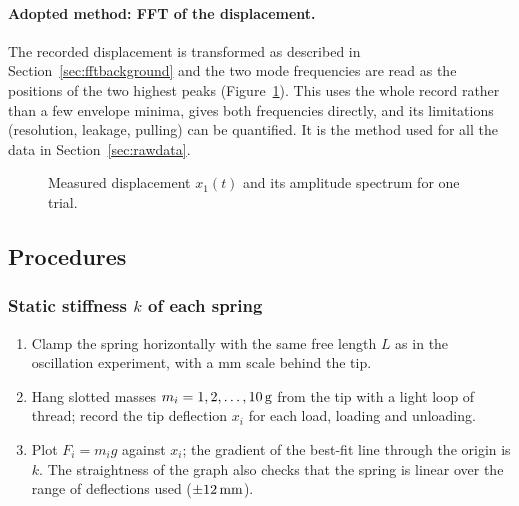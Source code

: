 \paragraph{Adopted method: FFT of the displacement.} The recorded displacement is transformed as described in Section~\ref{sec:fftbackground} and the two mode frequencies are read as the positions of the two highest peaks (Figure~\ref{fig:tracker}). This uses the whole record rather than a few envelope minima, gives both frequencies directly, and its limitations (resolution, leakage, pulling) can be quantified. It is the method used for all the data in Section~\ref{sec:rawdata}.

\begin{figure}[htbp]
\centering
{}
\caption{Measured displacement $x_1(t)$ and its amplitude spectrum for one trial. }
\label{fig:tracker}
\end{figure}

\subsection{Procedures}

\subsubsection{Static stiffness \texorpdfstring{$k$}{k} of each spring}
\begin{enumerate}
\item Clamp the spring horizontally with the same free length $L$ as in the oscillation experiment, with a mm scale behind the tip.
\item Hang slotted masses $m_i=1,2,\ldots,10\,\mathrm{g}$ from the tip with a light loop of thread; record the tip deflection $x_i$ for each load, loading and unloading.
\item Plot $F_i=m_ig$ against $x_i$; the gradient of the best-fit line through the origin is $k$. The straightness of the graph also checks that the spring is linear over the range of deflections used ($\pm12\,\mathrm{mm}$).
\end{enumerate}

